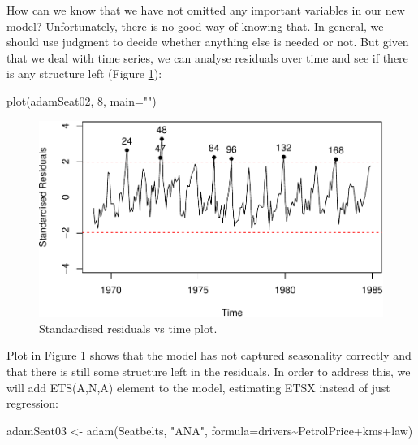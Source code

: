 \documentclass[
]{book}
\newenvironment{Shaded}{\begin{snugshade}}{\end{snugshade}}
\newcommand{\AttributeTok}[1]{\textcolor[rgb]{0.77,0.63,0.00}{#1}}
\newcommand{\DecValTok}[1]{\textcolor[rgb]{0.00,0.00,0.81}{#1}}
\newcommand{\FunctionTok}[1]{\textcolor[rgb]{0.00,0.00,0.00}{#1}}
\newcommand{\NormalTok}[1]{#1}
\newcommand{\OtherTok}[1]{\textcolor[rgb]{0.56,0.35,0.01}{#1}}
\newcommand{\SpecialCharTok}[1]{\textcolor[rgb]{0.00,0.00,0.00}{#1}}
\newcommand{\StringTok}[1]{\textcolor[rgb]{0.31,0.60,0.02}{#1}}
\theoremstyle{definition}
\theoremstyle{definition}
\theoremstyle{definition}
\theoremstyle{definition}
\theoremstyle{remark}
\begin{document}
How can we know that we have not omitted any important variables in our new model? Unfortunately, there is no good way of knowing that. In general, we should use judgment to decide whether anything else is needed or not. But given that we deal with time series, we can analyse residuals over time and see if there is any structure left (Figure \ref{fig:adamSeat02Resid}):

\begin{Shaded}
\begin{Highlighting}[]
\FunctionTok{plot}\NormalTok{(adamSeat02, }\DecValTok{8}\NormalTok{, }\AttributeTok{main=}\StringTok{""}\NormalTok{)}
\end{Highlighting}
\end{Shaded}

\begin{figure}
\centering
\includegraphics{Svetunkov--2022----ADAM_files/figure-latex/adamSeat02Resid-1.pdf}
\caption{\label{fig:adamSeat02Resid}Standardised residuals vs time plot.}
\end{figure}

Plot in Figure \ref{fig:adamSeat02Resid} shows that the model has not captured seasonality correctly and that there is still some structure left in the residuals. In order to address this, we will add ETS(A,N,A) element to the model, estimating ETSX instead of just regression:

\begin{Shaded}
\begin{Highlighting}[]
\NormalTok{adamSeat03 }\OtherTok{\textless{}{-}} \FunctionTok{adam}\NormalTok{(Seatbelts, }\StringTok{"ANA"}\NormalTok{,}
                   \AttributeTok{formula=}\NormalTok{drivers}\SpecialCharTok{\textasciitilde{}}\NormalTok{PetrolPrice}\SpecialCharTok{+}\NormalTok{kms}\SpecialCharTok{+}\NormalTok{law)}
\end{Highlighting}
\end{Shaded}
\end{document}
